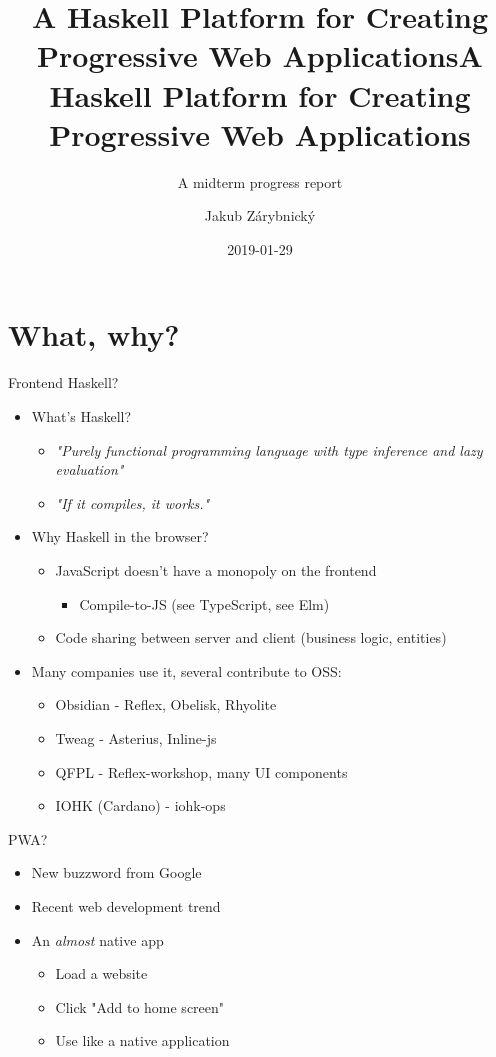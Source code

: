 \documentclass[presentation]{beamer}
\author{Jakub Zárybnický}
\date{2019-01-29}
\title{A Haskell Platform for Creating Progressive Web Applications}
\subtitle{A midterm progress report}
\title[PWAs in Haskell]{A Haskell Platform for Creating Progressive Web Applications}
\begin{document}
\maketitle

\section{What, why?}
\label{sec:org214f972}
\begin{frame}[label={sec:org6214eda}]{Frontend Haskell?}
\begin{itemize}
\item What's Haskell?  \pause
\begin{itemize}
\item \emph{"Purely functional programming language with type inference and lazy
evaluation"}  \pause
\item \emph{"If it compiles, it works."}   \pause
\end{itemize}
\item Why Haskell in the browser?     \pause
\begin{itemize}
\item JavaScript doesn't have a monopoly on the frontend
\begin{itemize}
\item Compile-to-JS (see TypeScript, see Elm)
\end{itemize}
\item Code sharing between server and client (business logic, entities)
\end{itemize}
\end{itemize}
\pause
\begin{itemize}
\item Many companies use it, several contribute to OSS:
\begin{itemize}
\item Obsidian - Reflex, Obelisk, Rhyolite
\item Tweag - Asterius, Inline-js
\item QFPL - Reflex-workshop, many UI components
\item IOHK (Cardano) - iohk-ops
\end{itemize}
\end{itemize}
\end{frame}

\begin{frame}[label={sec:org130a101}]{PWA?}
\begin{itemize}
\item New buzzword from Google
\item Recent web development trend
\item An \emph{almost} native app
\begin{itemize}
\item Load a website
\item Click "Add to home screen"
\item Use like a native application
\end{itemize}
\end{itemize}
\end{frame}
\end{document}
